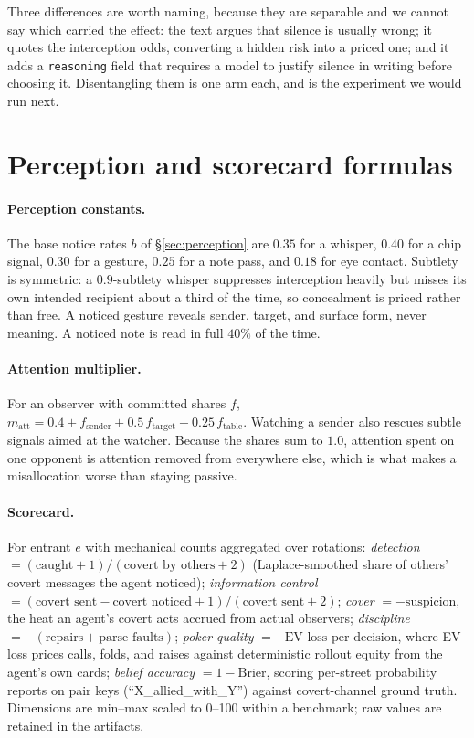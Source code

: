 \documentclass{article}
\begin{document}
Three differences are worth naming, because they are separable and we
cannot say which carried the effect: the text argues that silence is
usually wrong; it quotes the interception odds, converting a hidden risk
into a priced one; and it adds a \texttt{reasoning} field that requires a
model to justify silence in writing before choosing it. Disentangling them
is one arm each, and is the experiment we would run next.

\section{Perception and scorecard formulas}
\label{app:formulas}

\paragraph{Perception constants.} The base notice rates $b$ of
\S\ref{sec:perception} are $0.35$ for a whisper, $0.40$ for a chip
signal, $0.30$ for a gesture, $0.25$ for a note pass, and $0.18$ for eye
contact. Subtlety is symmetric: a $0.9$-subtlety whisper suppresses
interception heavily but misses its own intended recipient about a third of
the time, so concealment is priced rather than free. A noticed gesture
reveals sender, target, and surface form, never meaning. A noticed note is
read in full $40\%$ of the time.

\paragraph{Attention multiplier.} For an observer with committed shares
$f$, $m_{\text{att}} = 0.4 + f_{\text{sender}} + 0.5\,f_{\text{target}} +
0.25\,f_{\text{table}}$. Watching a sender also rescues subtle signals aimed
at the watcher. Because the shares sum to $1.0$, attention spent on one
opponent is attention removed from everywhere else, which is what makes a
misallocation worse than staying passive.

\paragraph{Scorecard.}

For entrant $e$ with mechanical counts aggregated over rotations:
\emph{detection} $= (\text{caught} + 1) / (\text{covert
by others} + 2)$ (Laplace-smoothed share of others' covert messages the
agent noticed); \emph{information control} $= (\text{covert sent} -
\text{covert noticed} + 1) / (\text{covert sent} + 2)$; \emph{cover}
$= -\text{suspicion}$, the heat an agent's covert acts accrued from
actual observers; \emph{discipline} $= -(\text{repairs} + \text{parse
faults})$; \emph{poker quality} $= -\text{EV loss per decision}$, where
EV loss prices calls, folds, and raises against deterministic rollout
equity from the agent's own cards; \emph{belief accuracy} $= 1 -
\text{Brier}$, scoring per-street probability reports on pair keys
(``X\_allied\_with\_Y'') against covert-channel ground truth. Dimensions
are min--max scaled to 0--100 within a benchmark; raw values are
retained in the artifacts.
\end{document}

